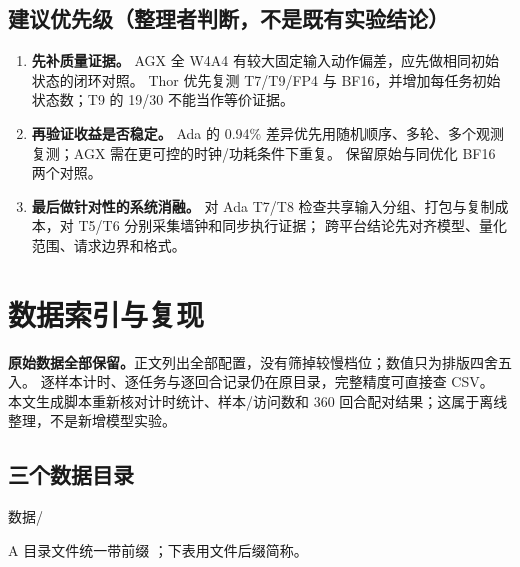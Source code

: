 \documentclass[UTF8,a4paper,11pt,fontset=fandol]{ctexart}
\newcommand{\key}[1]{\textbf{#1}}
\begin{document}
\subsection{建议优先级（整理者判断，不是既有实验结论）}
\begin{enumerate}
  \item \key{先补质量证据。}
  AGX 全 W4A4 有较大固定输入动作偏差，应先做相同初始状态的闭环对照。
  Thor 优先复测 T7/T9/FP4 与 BF16，并增加每任务初始状态数；T9 的 19/30 不能当作等价证据。
  \item \key{再验证收益是否稳定。}
  Ada 的 0.94\% 差异优先用随机顺序、多轮、多个观测复测；AGX 需在更可控的时钟/功耗条件下重复。
  保留原始与同优化 BF16 两个对照。
  \item \key{最后做针对性的系统消融。}
  对 Ada T7/T8 检查共享输入分组、打包与复制成本，对 T5/T6 分别采集墙钟和同步执行证据；
  跨平台结论先对齐模型、量化范围、请求边界和格式。
\end{enumerate}

\clearpage
\section{数据索引与复现}\label{sec:sources}
\key{原始数据全部保留。}正文列出全部配置，没有筛掉较慢档位；数值只为排版四舍五入。
逐样本计时、逐任务与逐回合记录仍在原目录，完整精度可直接查 CSV。
本文生成脚本重新核对计时统计、样本/访问数和 360 回合配对结果；这属于离线整理，不是新增模型实验。

\subsection{三个数据目录}
\begin{description}[leftmargin=12mm,style=nextline]
  \item[T] 
  \item[G] 数据/
  \item[A] 
\end{description}
A 目录文件统一带前缀 ；下表用文件后缀简称。
\end{document}
